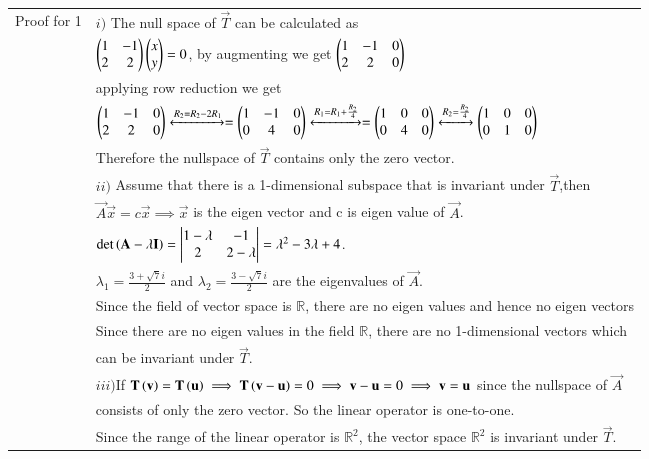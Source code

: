 \documentclass[journal,12pt]{IEEEtran}
\begin{document}
\begin{longtable}{|l|l|}
    \hline
    Proof for 1  & $i)$  The null space of $\vec{T}$ can be calculated as\\
   & \quad $\begin{pmatrix}1&-1\\2&2\end{pmatrix}\begin{pmatrix}x\\y\end{pmatrix}=0$, by augmenting we get $\begin{pmatrix}1&-1&0\\2&2&0\end{pmatrix}$ \\
   &\quad applying row reduction we get\\
   &\quad $\begin{pmatrix}1&-1&0\\2&2&0\end{pmatrix}\xleftrightarrow{R_2=R_2-2R_1}=\begin{pmatrix}1&-1&0\\0&4&0\end{pmatrix}\xleftrightarrow{R_1=R_1+\frac{R_2}{4}}=\begin{pmatrix}1&0&0\\0&4&0\end{pmatrix}\xleftrightarrow{R_2=\frac{R_2}{4}}\begin{pmatrix}1&0&0\\0&1&0\end{pmatrix}$\\
   &\quad Therefore the nullspace of $\vec{T}$ contains only the zero vector.\\
   &$ii)$ Assume that there is a 1-dimensional subspace that is invariant under $\vec{T}$,then \\
   &\quad $\vec{A}\vec{x}=c\vec{x}\implies\vec{x}$ is the eigen vector and c is eigen value of $\vec{A}$.\\
    & \qquad  \qquad \qquad \qquad $\det \left(\mathbf{A}-\lambda \mathbf{I}\right)=\begin{vmatrix}1-\lambda&-1\\2&2-\lambda\end{vmatrix}=\lambda^2-3\lambda+4$.\\
    &\qquad  \qquad \qquad \qquad $\lambda_1=\frac{3+\sqrt{7}i}{2}$ and $\lambda_2=\frac{3-\sqrt{7}i}{2}$ are the eigenvalues of $\vec{A}$.\\
   &\quad Since the field of vector space is $\mathbb{R}$, there are no eigen values and hence no eigen vectors\\
   &\quad Since there are no eigen values in the field $\mathbb{R}$, there are no 1-dimensional vectors which\\
   &\quad can be invariant under $\vec{T}$.\\
   &$iii)$If $\mathbf{T}\left(\mathbf{v}\right)=\mathbf{T}\left(\mathbf{u}\right)\implies \mathbf{T}\left(\mathbf{v-u}\right)=0\implies \mathbf{v-u}=0\implies \mathbf{v}=\mathbf{u}$ since the nullspace of $\vec{A}$\\
   & \quad consists of only the zero vector. So the linear operator is one-to-one.\\
   &Since the range of the linear operator is $\mathbb{R}^2$, the vector space $\mathbb{R}^2$ is invariant under $\vec{T}$.\\

\end{longtable}
\end{document}
